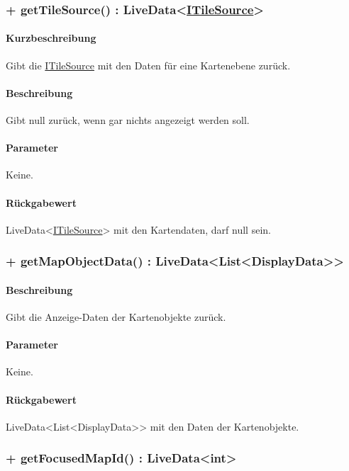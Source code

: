 \subsubsection{+ getTileSource() : LiveData<\href{https://osmdroid.github.io/osmdroid/javadocAll/org/osmdroid/tileprovider/tilesource/ITileSource.html}{ITileSource}>}%
\paragraph*{Kurzbeschreibung}
Gibt die \href{https://osmdroid.github.io/osmdroid/javadocAll/org/osmdroid/tileprovider/tilesource/ITileSource.html}
{ITileSource} mit den Daten für eine Kartenebene zurück.
\paragraph*{Beschreibung}
Gibt null zurück, wenn gar nichts angezeigt werden soll.
\paragraph*{Parameter}
Keine.
\paragraph*{Rückgabewert}
LiveData<\href{https://osmdroid.github.io/osmdroid/javadocAll/org/osmdroid/tileprovider/tilesource/ITileSource.html}
{ITileSource}> mit den Kartendaten, darf null sein.

\subsubsection{+ getMapObjectData() : LiveData<List<DisplayData>>}%
\paragraph*{Beschreibung}
Gibt die Anzeige-Daten der Kartenobjekte zurück.
\paragraph*{Parameter}
Keine.
\paragraph*{Rückgabewert}
LiveData<List<DisplayData>> mit den Daten der Kartenobjekte.

\subsubsection{+ getFocusedMapId() : LiveData<int>}%

